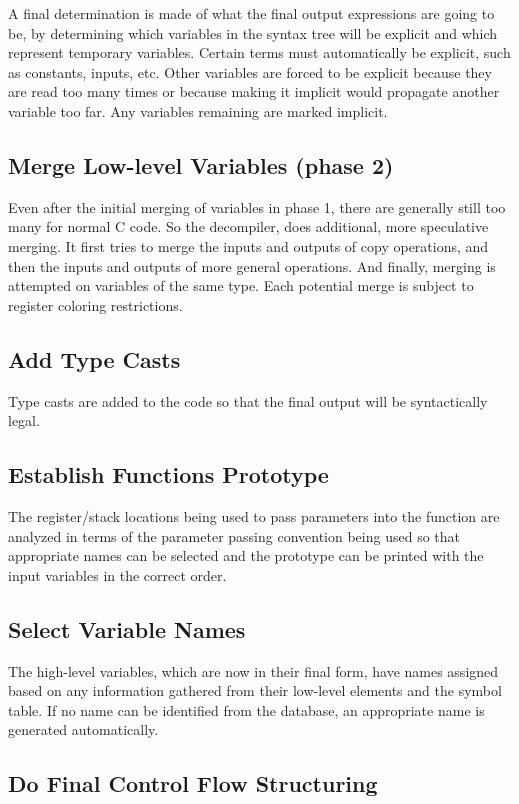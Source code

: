 A final determination is made of what the final output expressions are going to be, by determining which variables in the syntax tree will be explicit and which represent temporary variables. Certain terms must automatically be explicit, such as constants, inputs, etc. Other variables are forced to be explicit because they are read too many times or because making it implicit would propagate another variable too far. Any variables remaining are marked implicit.\hypertarget{index_step9}{}\subsection{Merge Low-\/level Variables (phase 2)}\label{index_step9}
Even after the initial merging of variables in phase 1, there are generally still too many for normal C code. So the decompiler, does additional, more speculative merging. It first tries to merge the inputs and outputs of copy operations, and then the inputs and outputs of more general operations. And finally, merging is attempted on variables of the same type. Each potential merge is subject to register coloring restrictions.\hypertarget{index_step10}{}\subsection{Add Type Casts}\label{index_step10}
Type casts are added to the code so that the final output will be syntactically legal.\hypertarget{index_step11}{}\subsection{Establish Function\textquotesingle{}s Prototype}\label{index_step11}
The register/stack locations being used to pass parameters into the function are analyzed in terms of the parameter passing convention being used so that appropriate names can be selected and the prototype can be printed with the input variables in the correct order.\hypertarget{index_step12}{}\subsection{Select Variable Names}\label{index_step12}
The high-\/level variables, which are now in their final form, have names assigned based on any information gathered from their low-\/level elements and the symbol table. If no name can be identified from the database, an appropriate name is generated automatically.\hypertarget{index_step13}{}\subsection{Do Final Control Flow Structuring}\label{index_step13}

